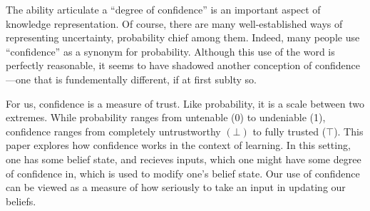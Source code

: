 \def\stmt{$A$}


The ability articulate a ``degree of confidence'' is an important aspect of knowledge representation.
Of course, there are many well-established ways of representing uncertainty,
	probability chief among them.
Indeed, many people use ``confidence'' as a synonym for probability.
Although this use of the word is perfectly reasonable, it seems to have shadowed another conception of confidence---one that is fundementally different, if at first sublty so. 
 





For us, confidence is a measure of trust. 
Like probability, it is a scale between two extremes. 
While probability ranges from untenable (0) to undeniable (1),
confidence ranges from completely untrustworthy $(\bot)$ to fully trusted ($\top$). 
%
This paper explores how confidence works in the context of learning.
In this setting, one has some belief state, and recieves inputs, which one might have some degree of confidence in, which is used to modify one's belief state. 
Our use of confidence can be viewed as a measure of how seriously to take an input in updating our beliefs.

